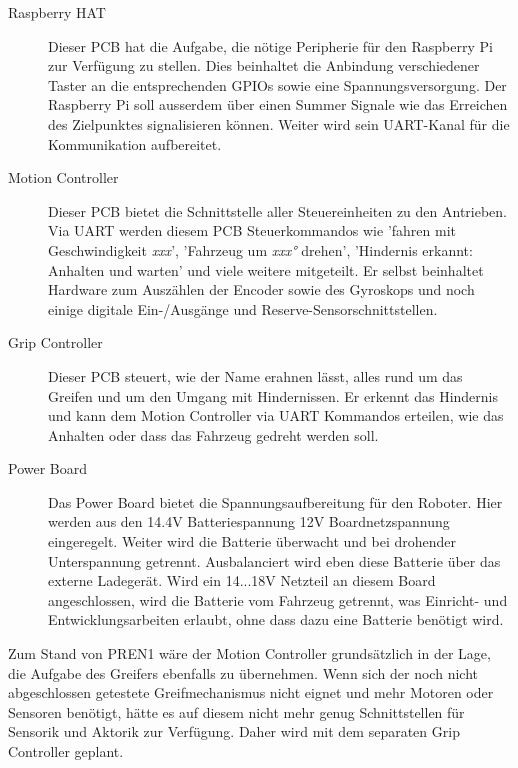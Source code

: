 \documentclass[main.tex]{subfiles} %
\begin{document}
\begin{description}
      \item[Raspberry HAT] Dieser PCB hat die Aufgabe, die nötige Peripherie für den
            Raspberry Pi zur Verfügung zu stellen. Dies beinhaltet die Anbindung
            verschiedener Taster an die entsprechenden GPIOs sowie eine
            Spannungsversorgung. Der Raspberry Pi soll ausserdem über einen Summer Signale
            wie das Erreichen des Zielpunktes signalisieren können. Weiter wird sein
            UART-Kanal für die Kommunikation aufbereitet.
      \item[Motion Controller] Dieser PCB bietet die Schnittstelle aller Steuereinheiten zu
            den Antrieben. Via UART werden diesem PCB Steuerkommandos wie 'fahren mit
            Geschwindigkeit \textit{xxx}', 'Fahrzeug um \textit{xxx°} drehen', 'Hindernis
            erkannt: Anhalten und warten' und viele weitere mitgeteilt. Er selbst
            beinhaltet Hardware zum Auszählen der Encoder sowie des Gyroskops und noch
            einige digitale Ein-/Ausgänge und Reserve-Sensorschnittstellen.
      \item[Grip Controller] Dieser PCB steuert, wie der Name erahnen lässt, alles rund um
            das Greifen und um den Umgang mit Hindernissen. Er erkennt das Hindernis und
            kann dem Motion Controller via UART Kommandos erteilen, wie das Anhalten oder
            dass das Fahrzeug gedreht werden soll.
      \item[Power Board] Das Power Board bietet die Spannungsaufbereitung für den Roboter.
            Hier werden aus den 14.4V Batteriespannung 12V Boardnetzspannung eingeregelt.
            Weiter wird die Batterie überwacht und bei drohender Unterspannung getrennt.
            Ausbalanciert wird eben diese Batterie über das externe Ladegerät. Wird ein
            14...18V Netzteil an diesem Board angeschlossen, wird die Batterie vom Fahrzeug
            getrennt, was Einricht- und Entwicklungsarbeiten erlaubt, ohne dass dazu eine
            Batterie benötigt wird.
\end{description}

Zum Stand von PREN1 wäre der Motion Controller grundsätzlich in der Lage, die
Aufgabe des Greifers ebenfalls zu übernehmen. Wenn sich der noch nicht
abgeschlossen getestete Greifmechanismus nicht eignet und mehr Motoren oder
Sensoren benötigt, hätte es auf diesem nicht mehr genug Schnittstellen für
Sensorik und Aktorik zur Verfügung. Daher wird mit dem separaten Grip
Controller geplant.
\end{document}
